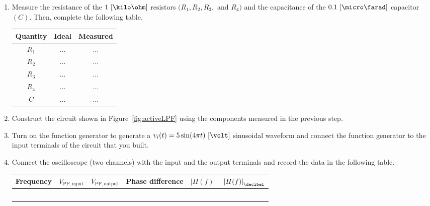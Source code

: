 \begin{enumerate}

 
\item Measure the resistance of the $1~[\kilo\ohm]$ resistors $(R_1,R_2,R_3,$ and $R_4)$ and the capacitance of the $0.1~[\micro\farad]$ capacitor $(C).$ Then, complete the following table.

  \begin{center}
    \begin{tabular}{c|c|c}
      \toprule
      Quantity &  Ideal & Measured\\
      \toprule
      $R_1$ & $\ldots$ & $\ldots$\\   %
      $R_2$ & $\ldots$ & $\ldots$\\   %
      $R_3$ & $\ldots$ & $\ldots$\\   %
      $R_4$ & $\ldots$ & $\ldots$\\   %
      $C$ & $\ldots$ & $\ldots$\\   %
      \bottomrule
    \end{tabular}    
  \end{center}
  
\item Construct the circuit shown in Figure~\ref{fig:activeLPF} using the components measured in the previous step. 

\item  Turn on the function generator to generate a $v_i(t) = 5\sin(4\pi t)~[\volt]$ sinusoidal waveform and connect the function generator to the input terminals of the circuit that you built.

\item Connect the oscilloscope (two channels) with the input and the output terminals and record the data in the following table. %
%
    \begin{center}
    \begin{tabular}{c|c|c|c|c|c}
      \toprule
      Frequency &  $V_{\mathrm{PP,input}}$ & $V_{\mathrm{PP,output}}$ & Phase difference & $\left |H(f) \right |$ & $\left |H(f) \right |_{\decibel}$\\
      \toprule
      ~ & ~ & ~ & ~ & ~ & ~\\
      \bottomrule
    \end{tabular}    
  \end{center}
%  
  


\end{enumerate}
